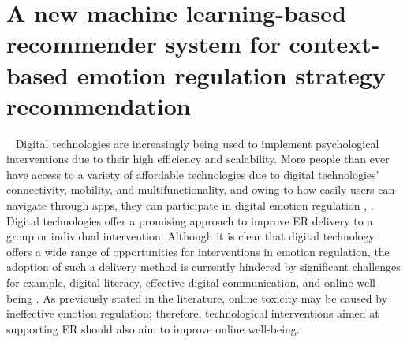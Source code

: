 \newpage 
\section{A new machine learning-based recommender system for context-based emotion regulation strategy recommendation}~\label{sec:evaluation}
Digital technologies are increasingly being used to implement psychological interventions due to their high efficiency and scalability. More people than ever have access to a variety of affordable technologies due to digital technologies' connectivity, mobility, and multifunctionality, and owing to how easily users can navigate through apps, they can participate in digital emotion regulation \cite{reynarddigital}, \cite{bettis2022digital}. Digital technologies offer a promising approach to improve ER delivery to a group or individual intervention. Although it is clear that digital technology offers a wide range of opportunities for interventions in emotion regulation, the adoption of such a delivery method is currently hindered by significant challenges for example, digital literacy, effective digital communication, and online well-being \cite{jadhakhan2022efficacy}. As previously stated in the literature, online toxicity may be caused by ineffective emotion regulation; therefore, technological interventions aimed at supporting ER should also aim to improve online well-being.

